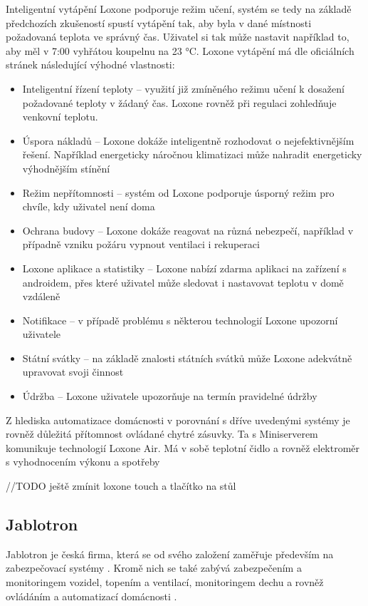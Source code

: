 Inteligentní vytápění Loxone podporuje režim učení, systém se tedy na základě předchozích zkušeností spustí vytápění tak, aby byla v dané místnosti požadovaná teplota ve správný čas. Uživatel si tak může nastavit například to, aby měl v 7:00 vyhřátou koupelnu na 23 °C. \newline
Loxone vytápění má dle oficiálních stránek \cite{LoxoneRegulaceTeploty} následující výhodné vlastnosti:
\begin{itemize}
    \item Inteligentní řízení teploty – využití již zmíněného režimu učení k dosažení požadované teploty v žádaný čas. Loxone rovněž při regulaci zohledňuje venkovní teplotu.
    \item Úspora nákladů – Loxone dokáže inteligentně rozhodovat o nejefektivnějším řešení. Například energeticky náročnou klimatizaci může nahradit energeticky výhodnějším stínění
    \item Režim nepřítomnosti – systém od Loxone podporuje úsporný režim pro chvíle, kdy uživatel není doma
    \item Ochrana budovy – Loxone dokáže reagovat na různá nebezpečí, například v případně vzniku požáru vypnout ventilaci i rekuperaci
    \item Loxone aplikace a statistiky – Loxone nabízí zdarma aplikaci na zařízení s androidem, přes které uživatel může sledovat i nastavovat teplotu v domě vzdáleně
    \item Notifikace – v případě problému s některou technologií Loxone upozorní uživatele
    \item Státní svátky – na základě znalosti státních svátků může Loxone adekvátně upravovat svoji činnost
    \item Údržba – Loxone uživatele upozorňuje na termín pravidelné údržby
\end{itemize}
Z hlediska automatizace domácnosti v porovnání s dříve uvedenými systémy je rovněž důležitá přítomnost ovládané chytré zásuvky. Ta s Miniserverem komunikuje technologií Loxone Air. Má v sobě teplotní čidlo a rovněž elektroměr s vyhodnocením výkonu a spotřeby 

//TODO ještě zmínit loxone touch a tlačítko na stůl

\subsection*{Jablotron}
Jablotron je česká firma, která se od svého založení zaměřuje především na zabezpečovací systémy \cite{OJablotronu}. Kromě nich se také zabývá zabezpečením a monitoringem vozidel, topením a ventilací, monitoringem dechu a rovněž ovládáním a automatizací domácnosti \cite{NaseChytraReseniJablotron}.


